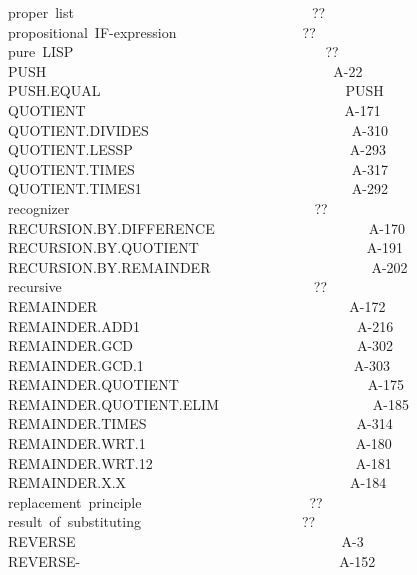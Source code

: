 \documentclass[11pt]{book}
\newenvironment{pubasis}{\begin{flushleft}\ttfamily\small}{\normalsize\rmfamily\end{flushleft}}
\begin{document}
\begin{pubasis}
proper~list~~~~~~~~~~~~~~~~~~~~~~~~~~~~~~~~~~??\\
propositional~IF-expression~~~~~~~~~~~~~~~~~~??\\
pure~LISP~~~~~~~~~~~~~~~~~~~~~~~~~~~~~~~~~~~~??\\
PUSH~~~~~~~~~~~~~~~~~~~~~~~~~~~~~~~~~~~~~~~~~A-22\\
PUSH.EQUAL~~~~~~~~~~~~~~~~~~~~~~~~~~~~~~~~~~~PUSH\\
QUOTIENT~~~~~~~~~~~~~~~~~~~~~~~~~~~~~~~~~~~~~A-171\\
QUOTIENT.DIVIDES~~~~~~~~~~~~~~~~~~~~~~~~~~~~~A-310\\
QUOTIENT.LESSP~~~~~~~~~~~~~~~~~~~~~~~~~~~~~~~A-293\\
QUOTIENT.TIMES~~~~~~~~~~~~~~~~~~~~~~~~~~~~~~~A-317\\
QUOTIENT.TIMES1~~~~~~~~~~~~~~~~~~~~~~~~~~~~~~A-292\\
recognizer~~~~~~~~~~~~~~~~~~~~~~~~~~~~~~~~~~~??\\
RECURSION.BY.DIF\-FER\-ENCE~~~~~~~~~~~~~~~~~~~~~~A-170\\
RECURSION.BY.QUOTIENT~~~~~~~~~~~~~~~~~~~~~~~~A-191\\
RECURSION.BY.REMAINDER~~~~~~~~~~~~~~~~~~~~~~~A-202\\
recursive~~~~~~~~~~~~~~~~~~~~~~~~~~~~~~~~~~~~??\\
REMAINDER~~~~~~~~~~~~~~~~~~~~~~~~~~~~~~~~~~~~A-172\\
REMAINDER.ADD1~~~~~~~~~~~~~~~~~~~~~~~~~~~~~~~A-216\\
REMAINDER.GCD~~~~~~~~~~~~~~~~~~~~~~~~~~~~~~~~A-302\\
REMAINDER.GCD.1~~~~~~~~~~~~~~~~~~~~~~~~~~~~~~A-303\\
REMAINDER.QUOTIENT~~~~~~~~~~~~~~~~~~~~~~~~~~~A-175\\
REMAINDER.QUOTIENT.ELIM~~~~~~~~~~~~~~~~~~~~~~A-185\\
REMAINDER.TIMES~~~~~~~~~~~~~~~~~~~~~~~~~~~~~~A-314\\
REMAINDER.WRT.1~~~~~~~~~~~~~~~~~~~~~~~~~~~~~~A-180\\
REMAINDER.WRT.12~~~~~~~~~~~~~~~~~~~~~~~~~~~~~A-181\\
REMAINDER.X.X~~~~~~~~~~~~~~~~~~~~~~~~~~~~~~~~A-184\\
replacement~principle~~~~~~~~~~~~~~~~~~~~~~~~??\\
result~of~substituting~~~~~~~~~~~~~~~~~~~~~~~??\\
REVERSE~~~~~~~~~~~~~~~~~~~~~~~~~~~~~~~~~~~~~~A-3\\
REVERSE-~~~~~~~~~~~~~~~~~~~~~~~~~~~~~~~~~~~~~A-152\\

\end{pubasis}
\end{document}
